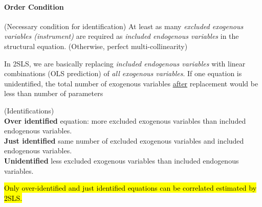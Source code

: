 \documentclass[]{article}
\begin{document}
			\paragraph{Order Condition}(Necessary condition for identification) At least as many \emph{excluded exogenous variables (instrument)} are required as \emph{included endogenous variables} in the structural equation. (Otherwise, perfect multi-collinearity)
			
			\begin{remark}
				In 2SLS, we are basically replacing \emph{included endogenous variables} with linear combinations (OLS prediction) of \emph{all exogenous variables}. If one equation is unidentified, the total number of exogenous variables \ul{after} replacement would be less than number of parameters
			\end{remark}
			\begin{definition} (Identifications) \\
				\textbf{Over identified} equation: more excluded exogenous variables than included endogenous variables. \\
				\textbf{Just identified} same number of excluded exogenous variables and included endogenous variables. \\
				\textbf{Unidentified} less excluded exogenous variables than included endogenous variables.
			\end{definition}
			\begin{remark}
				\hl{Only over-identified and just identified equations can be correlated estimated by 2SLS.}
			\end{remark}
\end{document}
